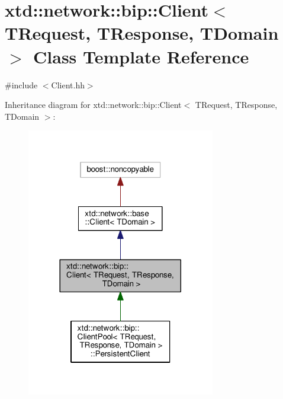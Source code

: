 \hypertarget{classxtd_1_1network_1_1bip_1_1Client}{}\section{xtd\+:\+:network\+:\+:bip\+:\+:Client$<$ T\+Request, T\+Response, T\+Domain $>$ Class Template Reference}
\label{classxtd_1_1network_1_1bip_1_1Client}


{\ttfamily \#include $<$Client.\+hh$>$}



Inheritance diagram for xtd\+:\+:network\+:\+:bip\+:\+:Client$<$ T\+Request, T\+Response, T\+Domain $>$\+:
\nopagebreak
\begin{figure}[H]
\begin{center}
\leavevmode
\includegraphics[width=233pt]{classxtd_1_1network_1_1bip_1_1Client__inherit__graph}
\end{center}
\end{figure}


